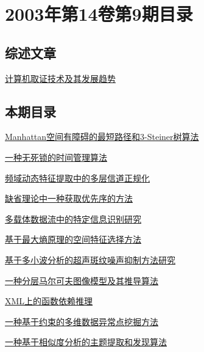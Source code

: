 \documentclass[a4paper]{article}
\begin{document}
\section{\textbf{2003年第14卷第9期目录}}
\subsection{综述文章}
\href{http://www.jos.org.cn/ch/reader/download_pdf.aspx?file_no=20030919&year_id=2003&quarter_id=9&falg=1}{计算机取证技术及其发展趋势}

\subsection{本期目录}
\href{http://www.jos.org.cn/ch/reader/download_pdf.aspx?file_no=20030901&year_id=2003&quarter_id=9&falg=1}{Manhattan空间有障碍的最短路径和3-Steiner树算法}

\href{http://www.jos.org.cn/ch/reader/download_pdf.aspx?file_no=20030902&year_id=2003&quarter_id=9&falg=1}{一种无死锁的时间管理算法}

\href{http://www.jos.org.cn/ch/reader/download_pdf.aspx?file_no=20030903&year_id=2003&quarter_id=9&falg=1}{频域动态特征提取中的多层信道正规化}

\href{http://www.jos.org.cn/ch/reader/download_pdf.aspx?file_no=20030904&year_id=2003&quarter_id=9&falg=1}{缺省理论中一种获取优先序的方法}

\href{http://www.jos.org.cn/ch/reader/download_pdf.aspx?file_no=20030905&year_id=2003&quarter_id=9&falg=1}{多载体数据流中的特定信息识别研究}

\href{http://www.jos.org.cn/ch/reader/download_pdf.aspx?file_no=20030906&year_id=2003&quarter_id=9&falg=1}{基于最大熵原理的空间特征选择方法}

\href{http://www.jos.org.cn/ch/reader/download_pdf.aspx?file_no=20030907&year_id=2003&quarter_id=9&falg=1}{基于多小波分析的超声斑纹噪声抑制方法研究}

\href{http://www.jos.org.cn/ch/reader/download_pdf.aspx?file_no=20030908&year_id=2003&quarter_id=9&falg=1}{一种分层马尔可夫图像模型及其推导算法}

\href{http://www.jos.org.cn/ch/reader/download_pdf.aspx?file_no=20030909&year_id=2003&quarter_id=9&falg=1}{XML上的函数依赖推理}

\href{http://www.jos.org.cn/ch/reader/download_pdf.aspx?file_no=20030910&year_id=2003&quarter_id=9&falg=1}{一种基于约束的多维数据异常点挖掘方法}

\href{http://www.jos.org.cn/ch/reader/download_pdf.aspx?file_no=20030911&year_id=2003&quarter_id=9&falg=1}{一种基于相似度分析的主题提取和发现算法}
\end{document}
